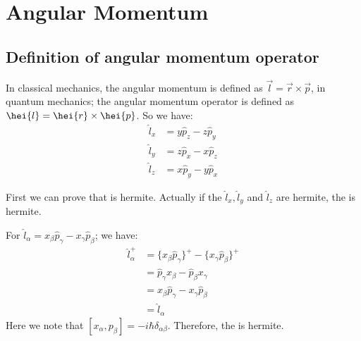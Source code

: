 %
%

%
%
\chapter{Angular Momentum}

\section{Definition of angular momentum operator}
%


In classical mechanics, the angular momentum is defined as
$\overrightarrow{l} = \overrightarrow{r}\times\overrightarrow{p}$,
in quantum mechanics; the angular momentum operator is defined as
$\hei{l} = \hei{r}\times\hei{p}$. So we have:
\begin{equation}\label{}
\begin{aligned}
         \hat{l}_{x} &= y\hat{p}_{z} -  z\hat{p}_{y} \nonumber \\
         \hat{l}_{y} &= z\hat{p}_{x} -  x\hat{p}_{z} \nonumber \\
         \hat{l}_{z} &= x\hat{p}_{y} -  y\hat{p}_{x}
 \end{aligned}
\end{equation}

First we can prove that  is hermite. Actually if the
$\hat{l}_{x}, \hat{l}_{y}$ and $\hat{l}_{z}$ are hermite, the
 is hermite.

For $\hat{l}_{\alpha} = x_{\beta}\hat{p}_{\gamma} -
x_{\gamma}\hat{p}_{\beta}$; we have:
\begin{align}\label{}
\hat{l}_{\alpha}^{+} &= \{x_{\beta}\hat{p}_{\gamma}\}^{+} -
\{x_{\gamma}\hat{p}_{\beta}\}^{+} \nonumber \\
&=\hat{p}_{\gamma}x_{\beta} - \hat{p}_{\beta}x_{\gamma} \nonumber \\
&=x_{\beta}\hat{p}_{\gamma} - x_{\gamma}\hat{p}_{\beta} \nonumber \\
&=\hat{l}_{\alpha}
\end{align}
Here we note that $[x_{\alpha}, p_{\beta}] =
-i\hbar\delta_{\alpha\beta}$. Therefore, the  is hermite.

